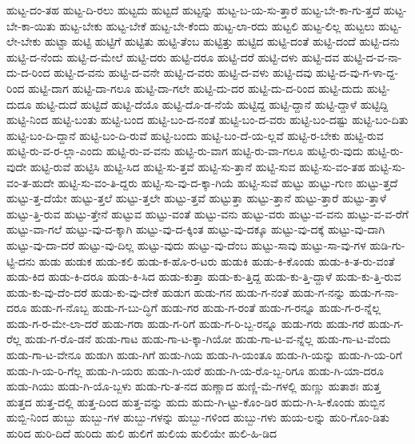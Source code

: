 {ಹುಟ್ಟ-ದಂ-ತಹ
ಹುಟ್ಟ-ದಿ-ರಲು
ಹುಟ್ಟದು
ಹುಟ್ಟದೆ
ಹುಟ್ಟನ್ನು
ಹುಟ್ಟ-ಬ-ಯ-ಸು-ತ್ತಾರೆ
ಹುಟ್ಟ-ಬೇ-ಕಾ-ಗು-ತ್ತದೆ
ಹುಟ್ಟ-ಬೇ-ಕಾ-ಯಿತು
ಹುಟ್ಟ-ಬೇಕು
ಹುಟ್ಟ-ಬೇಕೆ
ಹುಟ್ಟ-ಬೇ-ಕೆಂದು
ಹುಟ್ಟ-ಲಾ-ರದು
ಹುಟ್ಟಲಿ
ಹುಟ್ಟ-ಲಿಲ್ಲ
ಹುಟ್ಟಲು
ಹುಟ್ಟ-ಲೇ-ಬೇಕು
ಹುಟ್ಟಾ
ಹುಟ್ಟಿ
ಹುಟ್ಟಿಗೆ
ಹುಟ್ಟಿತು
ಹುಟ್ಟಿ-ತೆಂಬ
ಹುಟ್ಟಿತ್ತು
ಹುಟ್ಟಿದ
ಹುಟ್ಟಿ-ದಂತೆ
ಹುಟ್ಟಿ-ದಂದೆ
ಹುಟ್ಟಿ-ದನು
ಹುಟ್ಟಿ-ದ-ನೆಂದು
ಹುಟ್ಟಿ-ದ-ಮೇಲೆ
ಹುಟ್ಟಿ-ದರು
ಹುಟ್ಟಿ-ದರೂ
ಹುಟ್ಟಿ-ದರೆ
ಹುಟ್ಟಿ-ದಳು
ಹುಟ್ಟಿ-ದವ
ಹುಟ್ಟಿ-ದ-ವ-ನಾ-ದು-ದ-ರಿಂದ
ಹುಟ್ಟಿ-ದ-ವನು
ಹುಟ್ಟಿ-ದ-ವನೇ
ಹುಟ್ಟಿ-ದ-ವರು
ಹುಟ್ಟಿ-ದ-ವಳು
ಹುಟ್ಟಿ-ದವು
ಹುಟ್ಟಿ-ದ-ವು-ಗ-ಳಾ-ದ್ದ-ರಿಂದ
ಹುಟ್ಟಿ-ದಾಗ
ಹುಟ್ಟಿ-ದಾ-ಗಲೂ
ಹುಟ್ಟಿ-ದಾ-ಗಲೇ
ಹುಟ್ಟಿ-ದು-ದರ
ಹುಟ್ಟಿ-ದು-ದ-ರಿಂದ
ಹುಟ್ಟಿ-ದುದು
ಹುಟ್ಟಿ-ದುದೂ
ಹುಟ್ಟಿ-ದುದೆ
ಹುಟ್ಟಿದೆ
ಹುಟ್ಟಿ-ದೆಯೊ
ಹುಟ್ಟಿ-ದೊ-ಡ-ನೆಯೆ
ಹುಟ್ಟಿದ್ದ
ಹುಟ್ಟಿ-ದ್ದಾನೆ
ಹುಟ್ಟಿ-ದ್ದಾಳೆ
ಹುಟ್ಟಿದ್ದಿ
ಹುಟ್ಟಿ-ನಿಂದ
ಹುಟ್ಟಿ-ಬಂತು
ಹುಟ್ಟಿ-ಬಂದ
ಹುಟ್ಟಿ-ಬಂ-ದ-ನಂತೆ
ಹುಟ್ಟಿ-ಬಂ-ದ-ವರು
ಹುಟ್ಟಿ-ಬಂ-ದಷ್ಟು
ಹುಟ್ಟಿ-ಬಂ-ದಿತು
ಹುಟ್ಟಿ-ಬಂ-ದಿ-ದ್ದಾನೆ
ಹುಟ್ಟಿ-ಬಂ-ದಿ-ರುವೆ
ಹುಟ್ಟಿ-ಬಂದು
ಹುಟ್ಟಿ-ಬಂ-ದೆ-ಯ-ಲ್ಲವೆ
ಹುಟ್ಟಿ-ರ-ಬೇಕು
ಹುಟ್ಟಿ-ರುವ
ಹುಟ್ಟಿ-ರು-ವ-ರ-ಲ್ಲಾ-ಎಂದು
ಹುಟ್ಟಿ-ರು-ವ-ವನು
ಹುಟ್ಟಿ-ರು-ವಾಗ
ಹುಟ್ಟಿ-ರು-ವಾ-ಗಲೂ
ಹುಟ್ಟಿ-ರು-ವುದು
ಹುಟ್ಟಿ-ರು-ವುದೇ
ಹುಟ್ಟಿ-ರುವೆ
ಹುಟ್ಟಿಸಿ
ಹುಟ್ಟಿ-ಸಿದ
ಹುಟ್ಟಿ-ಸು-ತ್ತವೆ
ಹುಟ್ಟಿ-ಸು-ತ್ತಾನೆ
ಹುಟ್ಟಿ-ಸುವ
ಹುಟ್ಟಿ-ಸು-ವಂ-ತಹ
ಹುಟ್ಟಿ-ಸು-ವಂ-ತ-ಹುದೇ
ಹುಟ್ಟಿ-ಸು-ವಂ-ತಿ-ದ್ದರು
ಹುಟ್ಟಿ-ಸು-ವು-ದ-ಕ್ಕಾ-ಗಿಯೆ
ಹುಟ್ಟಿ-ಸುವೆ
ಹುಟ್ಟು
ಹುಟ್ಟು-ಗುಣ
ಹುಟ್ಟು-ತ್ತದೆ
ಹುಟ್ಟು-ತ್ತ-ದೆಯೇ
ಹುಟ್ಟು-ತ್ತಲೆ
ಹುಟ್ಟು-ತ್ತಲೇ
ಹುಟ್ಟು-ತ್ತವೆ
ಹುಟ್ಟುತ್ತಾ
ಹುಟ್ಟು-ತ್ತಾನೆ
ಹುಟ್ಟು-ತ್ತಾರೆ
ಹುಟ್ಟು-ತ್ತಾಳೆ
ಹುಟ್ಟು-ತ್ತಿ-ರುವ
ಹುಟ್ಟು-ತ್ತೇನೆ
ಹುಟ್ಟುವ
ಹುಟ್ಟು-ವಂತೆ
ಹುಟ್ಟು-ವನು
ಹುಟ್ಟು-ವರು
ಹುಟ್ಟು-ವ-ವನು
ಹುಟ್ಟು-ವ-ವ-ರೆಗೆ
ಹುಟ್ಟು-ವಾ-ಗಲೆ
ಹುಟ್ಟು-ವು-ದ-ಕ್ಕಾಗಿ
ಹುಟ್ಟು-ವು-ದ-ಕ್ಕಿಂತ
ಹುಟ್ಟು-ವು-ದಕ್ಕೂ
ಹುಟ್ಟು-ವು-ದಕ್ಕೆ
ಹುಟ್ಟು-ವು-ದಾಗಿ
ಹುಟ್ಟು-ವು-ದಾ-ದರೆ
ಹುಟ್ಟು-ವು-ದಿಲ್ಲ
ಹುಟ್ಟು-ವುದು
ಹುಟ್ಟು-ವು-ದೆಂಬ
ಹುಟ್ಟು-ಸಾವು
ಹುಟ್ಟು-ಸಾ-ವು-ಗಳ
ಹುಡಿ-ಗು-ಟ್ಟಿ-ದನು
ಹುಡು
ಹುಡುಕ
ಹುಡು-ಕಲಿ
ಹುಡು-ಕ-ಹೊ-ರ-ಟರು
ಹುಡುಕಿ
ಹುಡು-ಕಿ-ಕೊಂಡು
ಹುಡು-ಕಿ-ತ-ರು-ವಂತೆ
ಹುಡು-ಕಿದ
ಹುಡು-ಕಿ-ದರೂ
ಹುಡು-ಕಿ-ಸಿದ
ಹುಡು-ಕುತ್ತಾ
ಹುಡು-ಕು-ತ್ತಿದ್ದ
ಹುಡು-ಕು-ತ್ತಿ-ದ್ದಾಳೆ
ಹುಡು-ಕು-ತ್ತಿ-ರುವ
ಹುಡು-ಕು-ವು-ದೆಂ-ದರೆ
ಹುಡು-ಕು-ವು-ದೇಕೆ
ಹುಡುಗ
ಹುಡು-ಗನ
ಹುಡು-ಗ-ನಂತೆ
ಹುಡು-ಗ-ನನ್ನು
ಹುಡು-ಗ-ನಾ-ದರೂ
ಹುಡು-ಗ-ನೊಬ್ಬ
ಹುಡು-ಗ-ಬು-ದ್ಧಿಗೆ
ಹುಡು-ಗರ
ಹುಡು-ಗ-ರಂತೆ
ಹುಡು-ಗ-ರನ್ನೂ
ಹುಡು-ಗ-ರ-ನ್ನೆಲ್ಲ
ಹುಡು-ಗ-ರ-ಮೇ-ಲಾ-ದರೆ
ಹುಡು-ಗರಾ
ಹುಡು-ಗ-ರಿಗೆ
ಹುಡು-ಗ-ರಿ-ಬ್ಬ-ರನ್ನೂ
ಹುಡು-ಗರು
ಹುಡು-ಗರೆ
ಹುಡು-ಗ-ರೆಲ್ಲ
ಹುಡು-ಗ-ರೊ-ಡನೆ
ಹುಡು-ಗಾಟ
ಹುಡು-ಗಾ-ಟ-ಕ್ಕಾ-ಗಿಯೋ
ಹುಡು-ಗಾ-ಟ-ವ-ನ್ನೆಲ್ಲ
ಹುಡು-ಗಾ-ಟ-ವೆಂದು
ಹುಡು-ಗಾ-ಟ-ವೇನೂ
ಹುಡುಗಿ
ಹುಡು-ಗಿಗೆ
ಹುಡು-ಗಿಯ
ಹುಡು-ಗಿ-ಯಂತೂ
ಹುಡು-ಗಿ-ಯನ್ನು
ಹುಡು-ಗಿ-ಯ-ರಿಗೆ
ಹುಡು-ಗಿ-ಯ-ರಿ-ಗೆಲ್ಲ
ಹುಡು-ಗಿ-ಯರು
ಹುಡು-ಗಿ-ಯರೆ
ಹುಡು-ಗಿ-ಯ-ರೊ-ಬ್ಬ-ರಿಗೂ
ಹುಡು-ಗಿ-ಯಾ-ದರೂ
ಹುಡು-ಗಿಯು
ಹುಡು-ಗಿ-ಯೊ-ಬ್ಬಳು
ಹುಡು-ಗು-ತ-ನದ
ಹುಣ್ಣಾದ
ಹುಣ್ಣಿ-ಮೆ-ಗಳಲ್ಲಿ
ಹುಣ್ಣು
ಹುತಾಶಃ
ಹುತ್ತ
ಹುತ್ತದ
ಹುತ್ತ-ದಲ್ಲಿ
ಹುತ್ತ-ದಿಂದ
ಹುತ್ತ-ವನ್ನು
ಹುದು
ಹುದು-ಗಿ-ಟ್ಟು-ಕೊಂ-ಡಿರ
ಹುದು-ಗಿ-ಸಿ-ಕೊಂಡು
ಹುಬ್ಬಿನ
ಹುಬ್ಬಿ-ನಿಂದ
ಹುಬ್ಬು
ಹುಬ್ಬು-ಗಳ
ಹುಬ್ಬು-ಗಳನ್ನು
ಹುಬ್ಬು-ಗಳಿಂದ
ಹುಬ್ಬು-ಗಳು
ಹುಯ-ಲನ್ನು
ಹುರಿ-ಗೊಂ-ಡಿತು
ಹುರಿದ
ಹುರಿ-ದಿದೆ
ಹುರಿದು
ಹುಲಿ
ಹುಲಿಗೆ
ಹುಲಿಯ
ಹುಲಿಯೇ
ಹುಲಿ-ಹಿ-ಡಿದ
}
